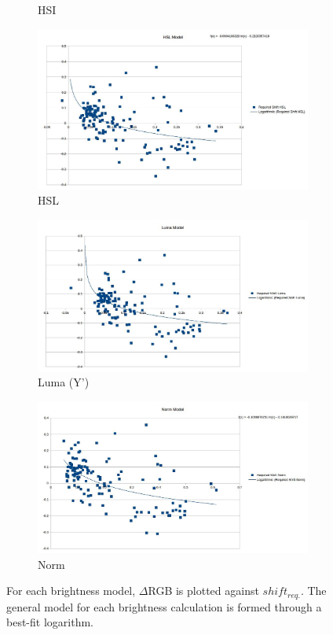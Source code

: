 \documentclass[12pt]{report}
\begin{document}
\begin{figure}
\begin{subfigure}{.49\linewidth}
  \caption{HSI}
\end{subfigure}
\hfill
\begin{subfigure}{.49\linewidth}
  \includegraphics[width=1\linewidth]{figures/model/scatter/model_hsl.jpg}
  \caption{HSL}
\end{subfigure}
\hfill
\begin{subfigure}{.49\linewidth}
  \includegraphics[width=1\linewidth]{figures/model/scatter/model_luma.jpg}
  \caption{Luma (Y')}
\end{subfigure}
\hfill
\begin{subfigure}{.49\linewidth}
  \includegraphics[width=1\linewidth]{figures/model/scatter/model_norm.jpg}
  \caption{Norm}
\end{subfigure}

\caption{For each brightness model, $\Delta$RGB is plotted against $shift_{req.}$. The general model for each brightness calculation is formed through a best-fit logarithm.}
\label{fig:model_scatter}
\end{figure}
\end{document}
